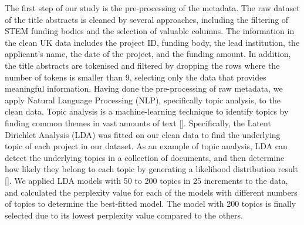 The first step of our study is the pre-processing of the metadata. The raw dataset of the title abstracts is cleaned by several approaches, including the filtering of STEM funding bodies and the selection of valuable columns. The information in the clean UK data includes the project ID, funding body, the lead institution, the applicant's name, the date of the project, and the funding amount. In addition, the title abstracts are tokenised and filtered by dropping the rows where the number of tokens is smaller than 9, selecting only the data that provides meaningful information.
\bigbreak
\noindent Having done the pre-processing of raw metadata, we apply Natural Language Processing (NLP), specifically topic analysis, to the clean data.  Topic analysis is a machine-learning technique to identify topics by finding common themes in vast amounts of text [\cite{Flavia}]. Specifically, the Latent Dirichlet Analysis (LDA) was fitted on our clean data to find the underlying topic of each project in our dataset. As an example of topic analysis, LDA can detect the underlying topics in a collection of documents, and then determine how likely they belong to each topic by generating a likelihood distribution result [\cite{wikipedia2023latent}]. We applied LDA models with 50 to 200 topics in 25 increments to the data, and calculated the perplexity value for each of the models with different numbers of topics to determine the best-fitted model. The model with 200 topics is finally selected due to its lowest perplexity value compared to the others. 

